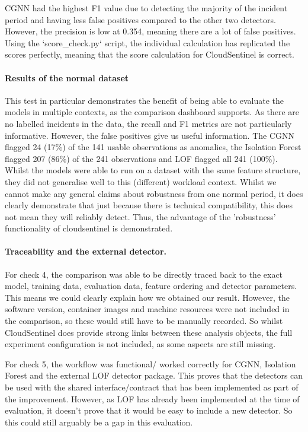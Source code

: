CGNN had the highest F1 value due to detecting the majority of the incident period and having less false positives compared to the other two detectors. However, the precision is low at 0.354, meaning there are a lot of false positives. Using the `score\_check.py` script, the individual calculation has replicated the scores perfectly, meaning that the score calculation for CloudSentinel is correct.

\paragraph{Results of the normal dataset}
This test in particular demonstrates the benefit of being able to evaluate the models in multiple contexts, as the comparison dashboard supports. As there are no labelled incidents in the data, the recall and F1 metrics are not particularly informative. However, the false positives give us useful information. The CGNN flagged 24 (17\%) of the 141 usable observations as anomalies, the Isolation Forest flagged 207 (86\%) of the 241 observations and LOF flagged all 241 (100\%). Whilst the models were able to run on a dataset with the same feature structure, they did not generalise well to this (different) workload context. Whilst we cannot make any general claims about robustness from one normal period, it does clearly demonstrate that just because there is technical compatibility, this does not mean they will reliably detect. Thus, the advantage of the 'robustness' functionality of cloudsentinel is demonstrated.

\paragraph{Traceability and the external detector.}
For check 4, the comparison was able to be directly traced back to the exact model, training data, evaluation data, feature ordering and detector parameters. This means we could clearly explain how we obtained our result. However, the software version, container images and machine resources were not included in the comparison, so these would still have to be manually recorded. So whilst CloudSentinel does provide strong links between these analysis objects, the full experiment configuration is not included, as some aspects are still missing.

For check 5, the workflow was functional/ worked correctly for CGNN, Isolation Forest and the external LOF detector package. This proves that the detectors can be used with the shared interface/contract that has been implemented as part of the improvement. However, as LOF has already been implemented at the time of evaluation, it doesn’t prove that it would be easy to include a new detector. So  this could still arguably be a gap in this evaluation.

